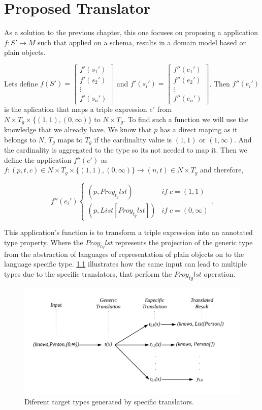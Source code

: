 \chapter{Proposed Translator}
\label{ch:proposed-translator}

As a solution to the previous chapter, this one focuses on
proposing a application $f : S' \rightarrow M$ such that
applied on a schema, results in a domain model based on
plain objects.

Lets define $f(S') = \begin{bmatrix}f'(s_1')\\ f'(s_2')\\ \vdots\\ f'(s_n')\end{bmatrix}$ and
$f'(s_i') = \begin{bmatrix}f''(e_1')\\ f''(e_2')\\ \vdots\\ f''(e_n')\end{bmatrix}$. Then $f''(e_i')$
is the aplication that maps a triple expression $e'$ from $N \times T_{g} \times \{(1,1),(0,\infty)\}$
to $N \times T_g$. To find such a function we will use the knowledge that we already have.
We know that $p$ has a direct maping as it belongs to $N$, $T_g$ maps to $T_g$ if
the cardinality value is $(1,1)$ or $(1, \infty)$. And the cardinality is aggregated to the type
so its not needed to map it. Then we define the application $f''(e')$ as $f:(p,t,c) \in N \times T_g \times \{(1,1), (0,\infty)\} \rightarrow (n,t)\in N \times T_g$
and therefore,

\begin{equation}
f''(e_i')
\begin{cases}
    (p,Proy_{t_g}lst) & if \; c=(1,1) \\
    (p,List[Proy_{t_g}lst]) & if \; c=(0,\infty)
\end{cases}.
\end{equation}

This application's function is to transform a triple expression
into an annotated type property. Where the $Proy_{tg}lst$ represents
the projection of the generic type from the abstraction of languages
of representation of plain objects on to the language specific type.
\cref{fig:lst-diagram} illustrates how the same input can lead to
multiple types due to the specific translators, that perform the 
$Proy_{tg}lst$ operation.

\begin{figure}
    \includegraphics[scale=0.8]{images/lsc-diagram.pdf}
    \centering
	\caption[Diferent target types generated by specific translators]{Diferent target types generated by specific translators.}
    \label{fig:lst-diagram}
\end{figure}